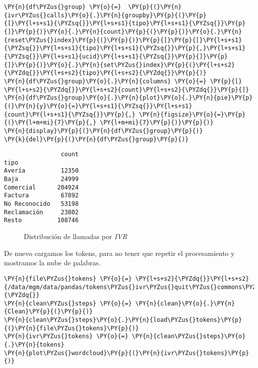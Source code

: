     \begin{tcolorbox}[breakable, size=fbox, boxrule=1pt, pad at break*=1mm,colback=cellbackground, colframe=cellborder]
\begin{Verbatim}[commandchars=\\\{\}]
\PY{n}{df\PYZus{}group} \PY{o}{=}  \PY{p}{(}\PY{n}{ivr\PYZus{}calls}\PY{o}{.}\PY{n}{groupby}\PY{p}{(}\PY{p}{[}\PY{l+s+s1}{\PYZsq{}}\PY{l+s+s1}{tipo}\PY{l+s+s1}{\PYZsq{}}\PY{p}{]}\PY{p}{)}\PY{o}{.}\PY{n}{count}\PY{p}{(}\PY{p}{)}\PY{o}{.}\PY{n}{reset\PYZus{}index}\PY{p}{(}\PY{p}{)}\PY{p}{[}\PY{p}{[}\PY{l+s+s1}{\PYZsq{}}\PY{l+s+s1}{tipo}\PY{l+s+s1}{\PYZsq{}}\PY{p}{,}\PY{l+s+s1}{\PYZsq{}}\PY{l+s+s1}{ucid}\PY{l+s+s1}{\PYZsq{}}\PY{p}{]}\PY{p}{]}\PY{p}{)}\PY{o}{.}\PY{n}{set\PYZus{}index}\PY{p}{(}\PY{l+s+s2}{\PYZdq{}}\PY{l+s+s2}{tipo}\PY{l+s+s2}{\PYZdq{}}\PY{p}{)}
\PY{n}{df\PYZus{}group}\PY{o}{.}\PY{n}{columns} \PY{o}{=} \PY{p}{[} \PY{l+s+s2}{\PYZdq{}}\PY{l+s+s2}{count}\PY{l+s+s2}{\PYZdq{}}\PY{p}{]}
\PY{n}{df\PYZus{}group}\PY{o}{.}\PY{n}{plot}\PY{o}{.}\PY{n}{pie}\PY{p}{(}\PY{n}{y}\PY{o}{=}\PY{l+s+s1}{\PYZsq{}}\PY{l+s+s1}{count}\PY{l+s+s1}{\PYZsq{}}\PY{p}{,} \PY{n}{figsize}\PY{o}{=}\PY{p}{(}\PY{l+m+mi}{7}\PY{p}{,} \PY{l+m+mi}{7}\PY{p}{)}\PY{p}{)}
\PY{n}{display}\PY{p}{(}\PY{n}{df\PYZus{}group}\PY{p}{)}
\PY{k}{del}\PY{p}{(}\PY{n}{df\PYZus{}group}\PY{p}{)}
\end{Verbatim}
\end{tcolorbox}

    
    \begin{verbatim}
                count
tipo                 
Avería          12350
Baja            24999
Comercial      204924
Factura         67892
No Reconocido   53198
Reclamación     23802
Resto          108746
    \end{verbatim}

    
\begin{figure}[!ht]
	\centering
    \caption{Distribución de llamadas por \textit{IVR}}
    \label{fig:distivr}
\end{figure}
    
    De nuevo cargamos los tokens, para no tener que repetir el procesamiento
y mostramos la nube de palabras.

    \begin{tcolorbox}[breakable, size=fbox, boxrule=1pt, pad at break*=1mm,colback=cellbackground, colframe=cellborder]
\begin{Verbatim}[commandchars=\\\{\}]
\PY{n}{file\PYZus{}tokens} \PY{o}{=} \PY{l+s+s2}{\PYZdq{}}\PY{l+s+s2}{/data/mgm/data/pandas/tokens\PYZus{}ivr\PYZus{}quit\PYZus{}commons\PYZus{}02112019.pkl}\PY{l+s+s2}{\PYZdq{}}
\PY{n}{clean\PYZus{}steps} \PY{o}{=} \PY{n}{clean}\PY{o}{.}\PY{n}{Clean}\PY{p}{(}\PY{p}{)}
\PY{n}{clean\PYZus{}steps}\PY{o}{.}\PY{n}{load\PYZus{}tokens}\PY{p}{(}\PY{n}{file\PYZus{}tokens}\PY{p}{)}
\PY{n}{ivr\PYZus{}tokens} \PY{o}{=} \PY{n}{clean\PYZus{}steps}\PY{o}{.}\PY{n}{tokens}
\PY{n}{plot\PYZus{}wordcloud}\PY{p}{(}\PY{n}{ivr\PYZus{}tokens}\PY{p}{)}
\end{Verbatim}
\end{tcolorbox}

